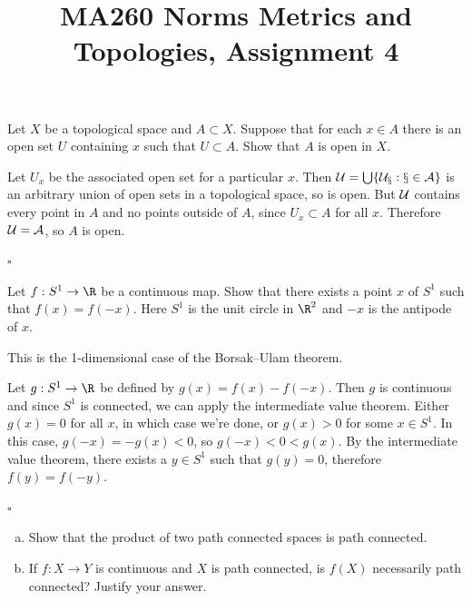 \documentclass[a4paper]{article}
\title{MA260 Norms Metrics and Topologies, Assignment 4}
\begin{document}
\maketitle

\setlength{\parindent}{0em}
\setlength{\parskip}{1em}


\begin{questionbody}
Let $X$ be a topological space and $A \subset X$. Suppose that for each $x \in A$ there is an open set $U$ containing $x$ such that $U \subset A$. Show that $A$ is open in $X$.
\end{questionbody}

Let $U_x$ be the associated open set for a particular $x$. Then $\cal U = \bigcup \{U_x : x \in A\}$ is an arbitrary union of open sets in a topological space, so is open. But $\cal U$ contains every point in $A$ and no points outside of $A$, since $U_x \subset A$ for all $x$. Therefore $\cal U = A$, so $A$ is open.

\hfill $\square$



\begin{questionbody}
Let $f : S^1 \to \R$ be a continuous map. Show that there exists a point $x$ of $S^1$ such that $f(x) = f(-x)$. Here $S^1$ is the unit circle in $\R^2$ and $-x$ is the antipode of $x$.
\end{questionbody}

This is the 1-dimensional case of the Borsak--Ulam theorem. %

Let $g : S^1 \to \R$ be defined by $g(x) = f(x) - f(-x)$. Then $g$ is continuous and since $S^1$ is connected, we can apply the intermediate value theorem. Either $g(x) = 0$ for all $x$, in which case we're done, or $g(x) > 0$ for some $x \in S^1$. In this case, $g(-x) = -g(x) < 0$, so $g(-x) < 0 < g(x)$. By the intermediate value theorem, there exists a $y \in S^1$ such that $g(y) = 0$, therefore $f(y) = f(-y)$.

\hfill $\square$



\begin{questionbody}
\begin{enumerate}[(a)]
\item Show that the product of two path connected spaces is path connected.

\item If $f : X \to Y$ is continuous and $X$ is path connected, is $f(X)$ necessarily path connected? Justify your answer.
\end{enumerate}
\end{questionbody}
\end{document}
